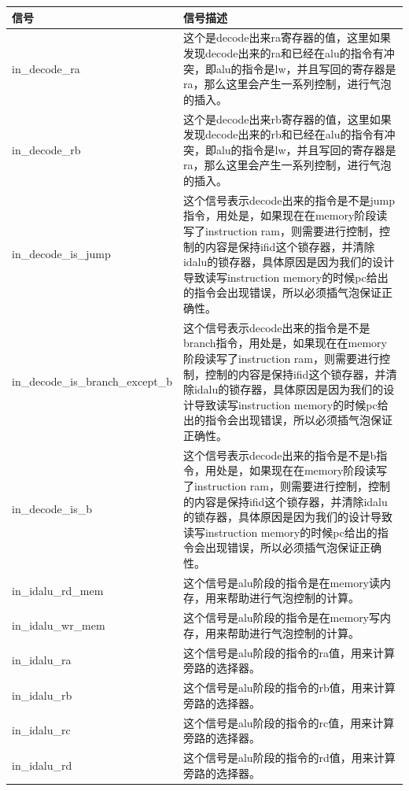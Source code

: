 \begin{center}
    \label{table:center_controllor}
    \begin{longtable}{p{}p{}}
        \toprule
        信号 & 信号描述 \\
        \midrule
            in\_decode\_ra & 这个是decode出来ra寄存器的值，这里如果发现decode出来的ra和已经在alu的指令有冲突，即alu的指令是lw，并且写回的寄存器是ra，那么这里会产生一系列控制，进行气泡的插入。\\
            in\_decode\_rb & 这个是decode出来rb寄存器的值，这里如果发现decode出来的rb和已经在alu的指令有冲突，即alu的指令是lw，并且写回的寄存器是ra，那么这里会产生一系列控制，进行气泡的插入。\\
            in\_decode\_is\_jump & 这个信号表示decode出来的指令是不是jump指令，用处是，如果现在在memory阶段读写了instruction ram，则需要进行控制，控制的内容是保持ifid这个锁存器，并清除idalu的锁存器，具体原因是因为我们的设计导致读写instruction memory的时候pc给出的指令会出现错误，所以必须插气泡保证正确性。\\
            in\_decode\_is\_branch\_except\_b & 这个信号表示decode出来的指令是不是branch指令，用处是，如果现在在memory阶段读写了instruction ram，则需要进行控制，控制的内容是保持ifid这个锁存器，并清除idalu的锁存器，具体原因是因为我们的设计导致读写instruction memory的时候pc给出的指令会出现错误，所以必须插气泡保证正确性。\\
            in\_decode\_is\_b & 这个信号表示decode出来的指令是不是b指令，用处是，如果现在在memory阶段读写了instruction ram，则需要进行控制，控制的内容是保持ifid这个锁存器，并清除idalu的锁存器，具体原因是因为我们的设计导致读写instruction memory的时候pc给出的指令会出现错误，所以必须插气泡保证正确性。\\
            in\_idalu\_rd\_mem & 这个信号是alu阶段的指令是在memory读内存，用来帮助进行气泡控制的计算。\\
            in\_idalu\_wr\_mem & 这个信号是alu阶段的指令是在memory写内存，用来帮助进行气泡控制的计算。\\
            in\_idalu\_ra & 这个信号是alu阶段的指令的ra值，用来计算旁路的选择器。\\
            in\_idalu\_rb & 这个信号是alu阶段的指令的rb值，用来计算旁路的选择器。\\
            in\_idalu\_rc & 这个信号是alu阶段的指令的rc值，用来计算旁路的选择器。\\
            in\_idalu\_rd & 这个信号是alu阶段的指令的rd值，用来计算旁路的选择器。\\

\end{longtable}
\end{center}
